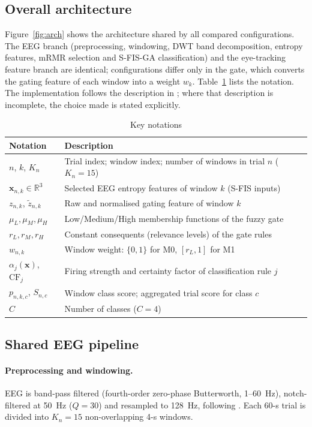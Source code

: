 \subsection{Overall architecture}
Figure~\ref{fig:arch} shows the architecture shared by all compared configurations. The EEG branch (preprocessing, windowing, DWT band decomposition, entropy features, mRMR selection and S-FIS-GA classification) and the eye-tracking feature branch are identical; configurations differ only in the gate, which converts the gating feature of each window into a weight $w_k$. Table~\ref{tab:notation} lists the notation. The implementation follows the description in \cite{FarhadiSedehi2024a}; where that description is incomplete, the choice made is stated explicitly.


\begin{table}[t]
\centering\small
\caption{Key notations}\label{tab:notation}
\begin{tabular}{@{}ll@{}}
\toprule
Notation & Description\\
\midrule
$n$, $k$, $K_n$ & Trial index; window index; number of windows in trial $n$ ($K_n=15$)\\
$\mathbf{x}_{n,k}\in\mathbb{R}^{3}$ & Selected EEG entropy features of window $k$ (S-FIS inputs)\\
$z_{n,k}$, $\tilde z_{n,k}$ & Raw and normalised gating feature of window $k$\\
$\mu_{L},\mu_{M},\mu_{H}$ & Low/Medium/High membership functions of the fuzzy gate\\
$r_{L},r_{M},r_{H}$ & Constant consequents (relevance levels) of the gate rules\\
$w_{n,k}$ & Window weight: $\{0,1\}$ for M0, $[r_L,1]$ for M1\\
$\alpha_j(\mathbf{x})$, $\mathrm{CF}_j$ & Firing strength and certainty factor of classification rule $j$\\
$p_{n,k,c}$, $S_{n,c}$ & Window class score; aggregated trial score for class $c$\\
$C$ & Number of classes ($C=4$)\\
\bottomrule
\end{tabular}
\end{table}

\subsection{Shared EEG pipeline}
\paragraph{Preprocessing and windowing.} EEG is band-pass filtered (fourth-order zero-phase Butterworth, 1--60~Hz), notch-filtered at 50~Hz ($Q=30$) and resampled to 128~Hz, following \cite{FarhadiSedehi2024a}. Each 60-s trial is divided into $K_n=15$ non-overlapping 4-s windows.

